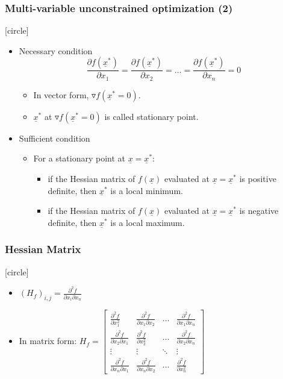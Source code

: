\documentclass{beamer}
\begin{document}
\begin{frame}
    \frametitle{Multi-variable unconstrained optimization (2)}
    [circle]
    \begin{itemize}
        \item Necessary condition
        $$\frac{\partial f(\underline{x}^*)}{\partial x_1}=
            \frac{\partial f(\underline{x}^*)}{\partial x_2}=
            \dots=
            \frac{\partial f(\underline{x}^*)}{\partial x_n}=0$$
        \begin{itemize}
            \item In vector form, $\triangledown f(\underline{x}^*=0)$.
            \item $\underline{x}^*$ at $\triangledown f(\underline{x}^*=0)$ is called stationary point.
        \end{itemize}
        \item Sufficient condition
        \begin{itemize}
            \item For a stationary point at $\underline{x}=\underline{x}^*$:
            \begin{itemize}
                \item if the Hessian matrix of $f(\underline{x})$ evaluated at $\underline{x}=\underline{x}^*$ is \alert{positive definite}, then $\underline{x}^*$ is a local minimum. 
                \item if the Hessian matrix of $f(\underline{x})$ evaluated at $\underline{x}=\underline{x}^*$ is \alert{negative definite}, then $\underline{x}^*$ is a local maximum. 
            \end{itemize}
        \end{itemize}
    \end{itemize}

\end{frame}

\begin{frame}
    \frametitle{Hessian Matrix}
    [circle]
    \begin{itemize}
        \item $(H_f)_{i,j}=\frac{\partial^2f}{\partial x_i \partial x_n}$
        \item In matrix form:     $H_f=\begin{bmatrix}\frac{\partial^2f}{\partial x^2_1} & \frac{\partial^2f}{\partial x_1 \partial x_2}  & \dots & \frac{\partial^2f}{\partial x_1 \partial x_n}\\
            \frac{\partial^2f}{\partial x_2 \partial x_1} & \frac{\partial^2f}{\partial x^2_2}  & \dots & \frac{\partial^2f}{\partial x_2 \partial x_n} \\
            \vdots & \vdots & \ddots & \vdots \\
            \frac{\partial^2f}{\partial x_n \partial x_1} & \frac{\partial^2f}{\partial x_n \partial x_2}  & \dots & \frac{\partial^2f}{\partial x^2_n}
        \end{bmatrix}$
    \end{itemize}
\end{frame}
\end{document}
